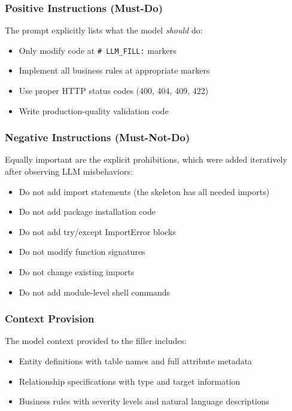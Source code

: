 \documentclass[11pt,a4paper]{article}
\begin{document}
{\subsubsection{Positive Instructions (Must-Do)}

The prompt explicitly lists what the model \emph{should} do:
\begin{itemize}
    \item Only modify code at {\lstinline|# LLM_FILL:|} markers
    \item Implement all business rules at appropriate markers
    \item Use proper HTTP status codes (400, 404, 409, 422)
    \item Write production-quality validation code
\end{itemize}

\subsubsection{Negative Instructions (Must-Not-Do)}

Equally important are the explicit prohibitions, which were added iteratively after observing LLM misbehaviors:
\begin{itemize}
    \item Do not add import statements (the skeleton has all needed imports)
    \item Do not add package installation code
    \item Do not add try/except ImportError blocks
    \item Do not modify function signatures
    \item Do not change existing imports
    \item Do not add module-level shell commands
\end{itemize}

\subsubsection{Context Provision}

The model context provided to the filler includes:
\begin{itemize}
    \item Entity definitions with table names and full attribute metadata
    \item Relationship specifications with type and target information
    \item Business rules with severity levels and natural language descriptions
\end{itemize}

}
\end{document}
